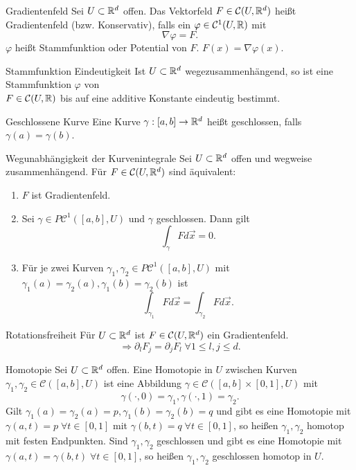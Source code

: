 \documentclass[main.tex]{subfiles}
\begin{document}
\begin{karte}{Gradientenfeld}
    Sei \(U \subset \mathbb{R}^d\) offen. Das Vektorfeld \(F \in \mathcal{C}(U,\mathbb{R}^d)\)
    heißt Gradientenfeld (bzw. Konservativ),
    falls ein \(\varphi \in \mathcal{C}^1(U, \mathbb{R})\) mit 
    \[ \nabla \varphi = F. \] 
    \(\varphi\) heißt Stammfunktion oder Potential von \(F\). 
    \( F(x) = \nabla \varphi (x) \).
\end{karte}

\begin{karte}{Stammfunktion Eindeutigkeit}
    Ist \( U \subset \mathbb{R}^d \) wegezusammenhängend, so 
    ist eine Stammfunktion \( \varphi \) von \\
    \( F \in \mathcal{C}(U, \mathbb{R}) \) 
    bis auf eine additive Konstante eindeutig bestimmt.
\end{karte}

\begin{karte}{Geschlossene Kurve}
    Eine Kurve \(\gamma : [a,b] \rightarrow \mathbb{R}^d\)
    heißt geschlossen, falls \(\gamma(a) = \gamma(b)\).
\end{karte}

\begin{karte}{Wegunabhängigkeit der Kurvenintegrale}
    Sei \( U \subset \mathbb{R}^d\) offen und wegweise zusammenhängend.
    Für \( F \in \mathcal{C}(U, \mathbb{R}^d) \) sind äquivalent:
    \begin{enumerate}
        \item \( F \) ist Gradientenfeld.
        \item Sei \(\gamma \in P\mathcal{C}^1([a,b], U)\) und 
        \(\gamma\) geschlossen. Dann gilt 
        \[ \int_\gamma F d\vec{x} = 0. \]
        \item  Für je zwei Kurven \(\gamma_1, \gamma_2 \in P\mathcal{C}^1([a,b],U)\)
        mit \(\gamma_1(a) = \gamma_2(a), \gamma_1(b) = \gamma_2(b)\) ist    
        \[ \int_{\gamma_1} F d\vec{x} = \int_{\gamma_2} F d\vec{x}. \]
    \end{enumerate}
\end{karte}

\begin{karte}{Rotationsfreiheit}
    Für \( U \subset \mathbb{R}^d \) ist \( F \in \mathcal{C}(U, \mathbb{R}^d) \)
    ein Gradientenfeld.
    \[ \Rightarrow \partial_l F_j 
    = \partial_j F_l \;\forall 1 \leq l,j \leq d. \]
\end{karte}

\begin{karte}{Homotopie}
    Sei \(U \subset \mathbb{R}^d\) offen. Eine Homotopie in \(U\)
    zwischen Kurven \(\gamma_1, \gamma_2 \in \mathcal{C}([a,b], U) \)
    ist eine Abbildung \(\gamma \in \mathcal{C}([a,b]\times [0,1], U)\) mit
    \[ \gamma(\cdot, 0) = \gamma_1, \gamma(\cdot, 1) = \gamma_2. \]
    Gilt \( \gamma_1(a) = \gamma_2(a) = p, 
    \gamma_1(b) = \gamma_2(b) = q \) und gibt es eine Homotopie mit    
    \(\gamma(a,t) = p \; \forall t \in [0,1]\) mit 
    \(\gamma(b,t) = q \; \forall t \in [0,1]\), so heißen \(\gamma_1, \gamma_2\)
    homotop mit festen Endpunkten. Sind \( \gamma_1, \gamma_2 \)
    geschlossen und gibt es eine Homotopie mit 
    \(\gamma(a, t) = \gamma(b,t) \; \forall t \in [0,1]\),
    so heißen \(\gamma_1, \gamma_2\) geschlossen homotop in \(U\).
\end{karte}
\end{document}
